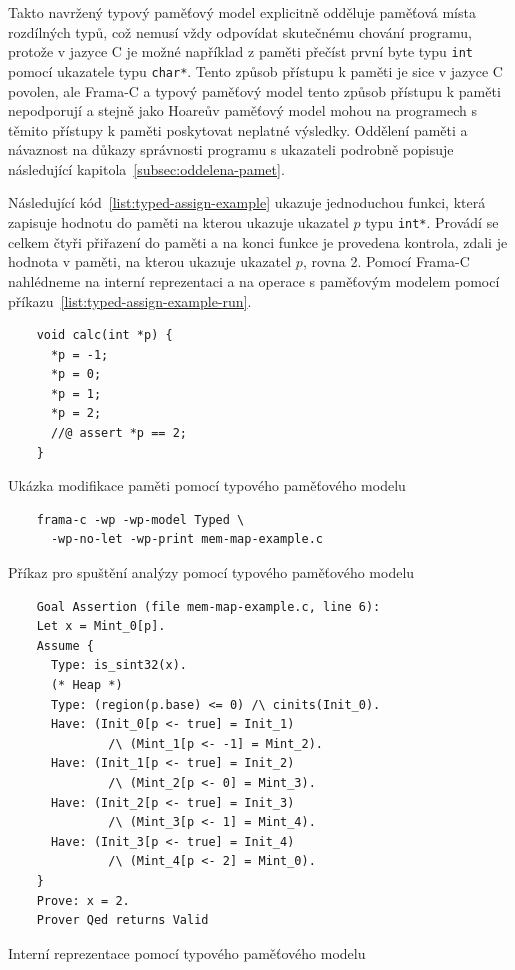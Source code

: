 
Takto navržený typový paměťový model explicitně odděluje paměťová místa rozdílných typů,
což nemusí vždy odpovídat skutečnému chování programu,
protože v jazyce C je možné například z paměti přečíst první byte typu \texttt{int}
pomocí ukazatele typu \texttt{char*}.
Tento způsob přístupu k paměti je sice v jazyce C povolen,
ale Frama\mbox{-}C a typový paměťový model tento způsob přístupu k paměti nepodporují
a stejně jako Hoareův paměťový model mohou na programech s těmito přístupy k paměti poskytovat neplatné výsledky.
Oddělení paměti a návaznost na důkazy správnosti programu s ukazateli
podrobně popisuje následující kapitola~\ref{subsec:oddelena-pamet}.

Následující kód~\ref{list:typed-assign-example} ukazuje jednoduchou funkci,
která zapisuje hodnotu do paměti na kterou ukazuje ukazatel $p$ typu \texttt{int*}.
Provádí se celkem čtyři přiřazení do paměti a na konci funkce je provedena kontrola,
zdali je hodnota v paměti, na kterou ukazuje ukazatel $p$, rovna 2.
Pomocí Frama\mbox{-}C nahlédneme na interní reprezentaci
a na operace s paměťovým modelem pomocí příkazu~\ref{list:typed-assign-example-run}.

\begin{listing}[H]
    \begin{verbatim}
    void calc(int *p) {
      *p = -1;
      *p = 0;
      *p = 1;
      *p = 2;
      //@ assert *p == 2;
    }
    \end{verbatim}
    \caption{Ukázka modifikace paměti pomocí typového paměťového modelu}
    \label{list:typed-assign-example}
\end{listing}

\begin{listing}[H]
    \begin{verbatim}
    frama-c -wp -wp-model Typed \
      -wp-no-let -wp-print mem-map-example.c
    \end{verbatim}
    \caption{Příkaz pro spuštění analýzy pomocí typového paměťového modelu}
    \label{list:typed-assign-example-run}
\end{listing}

\begin{listing}[H]
    \begin{verbatim}
    Goal Assertion (file mem-map-example.c, line 6):
    Let x = Mint_0[p].
    Assume {
      Type: is_sint32(x).
      (* Heap *)
      Type: (region(p.base) <= 0) /\ cinits(Init_0).
      Have: (Init_0[p <- true] = Init_1)
              /\ (Mint_1[p <- -1] = Mint_2).
      Have: (Init_1[p <- true] = Init_2)
              /\ (Mint_2[p <- 0] = Mint_3).
      Have: (Init_2[p <- true] = Init_3)
              /\ (Mint_3[p <- 1] = Mint_4).
      Have: (Init_3[p <- true] = Init_4)
              /\ (Mint_4[p <- 2] = Mint_0).
    }
    Prove: x = 2.
    Prover Qed returns Valid
    \end{verbatim}
    \caption{Interní reprezentace pomocí typového paměťového modelu}
    \label{list:typed-assign-example-result}
\end{listing}

